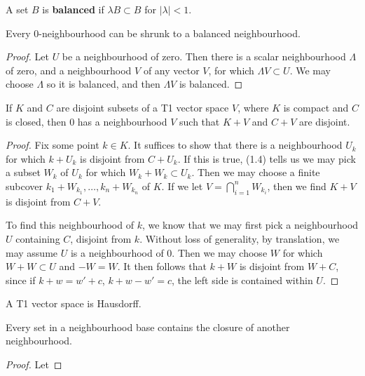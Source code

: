 \begin{definition}
    A set $B$ is {\bf balanced} if $\lambda B \subset B$ for $|\lambda| < 1$.
\end{definition}

\begin{lemma}
    Every 0-neighbourhood can be shrunk to a balanced neighbourhood.
\end{lemma}
\begin{proof}
    Let $U$ be a neighbourhood of zero. Then there is a scalar neighbourhood $\Lambda$ of zero, and a neighbourhood $V$ of any vector $V$, for which $\Lambda V \subset U$. We may choose $\Lambda$ so it is balanced, and then $\Lambda V$ is balanced.
\end{proof}

\begin{prop}
    If $K$ and $C$ are disjoint subsets of a T1 vector space $V$, where $K$ is compact and $C$ is closed, then 0 has a neighbourhood $V$ such that $K + V$ and $C + V$ are disjoint.
\end{prop}
\begin{proof}
    Fix some point $k \in K$. It suffices to show that there is a neighbourhood $U_k$ for which $k + U_k$ is disjoint from $C + U_k$. If this is true, (1.4) tells us we may pick a subset $W_k$ of $U_k$ for which $W_k + W_k \subset U_k$. Then we may choose a finite subcover $k_1 + W_{k_1}, \dots, k_n + W_{k_n}$ of $K$. If we let $V = \bigcap_{i = 1}^n W_{k_i}$, then we find $K + V$ is disjoint from $C + V$.

    To find this neighbourhood of $k$, we know that we may first pick a neighbourhood $U$ containing $C$, disjoint from $k$. Without loss of generality, by translation, we may assume $U$ is a neighbourhood of 0. Then we may choose $W$ for which $W + W \subset U$ and $-W = W$. It then follows that $k + W$ is disjoint from $W + C$, since if $k + w = w' + c$, $k + w - w' = c$, the left side is contained within $U$.
\end{proof}

\begin{corollary}
    A T1 vector space is Hausdorff.
\end{corollary}

\begin{corollary}
    Every set in a neighbourhood base contains the closure of another neighbourhood.
\end{corollary}
\begin{proof}
    Let 
\end{proof}

